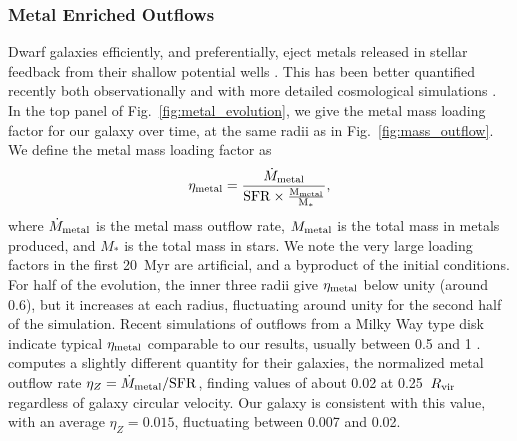 \documentclass[twocolumn]{aastex61}
\begin{document}
\subsubsection{Metal Enriched Outflows}
Dwarf galaxies efficiently, and preferentially, eject metals released in stellar feedback from their shallow potential wells \citep{MacLowFerrara1999,FerraraTolstoy2000}. This has been better quantified recently both observationally \citep[e.g.][]{Kirby2011-metals,Zahid2012,Peeples2014,McQuinn2015} and with more detailed cosmological simulations \citep{Angles-Alcazar2017,Muratov2017}. In the top panel of Fig.~\ref{fig:metal_evolution}, we give the metal mass loading factor for our galaxy over time, at the same radii as in Fig.~\ref{fig:mass_outflow}. We define the metal mass loading factor as
\begin{equation} \label{eq:eta-metal}
\eta_{\rm metal} = \frac{\dot{M}_{\rm metal}}{\rm{SFR} \times \frac{M_{\rm metal}}{M_{*}}},
\end{equation}
where $\dot{M}_{\rm metal}$ is the metal mass outflow rate, $M_{\rm metal}$ is the total mass in metals produced, and $M_{*}$ is the total mass in stars. We note the very large loading factors in the first 20~Myr are artificial, and a byproduct of the initial conditions. For half of the evolution, the inner three radii give $\eta_{\rm metal}$ below unity (around 0.6), but it increases at each radius, fluctuating around unity for the second half of the simulation. Recent simulations of outflows from a Milky Way type disk indicate typical $\eta_{\rm metal}$ comparable to our results, usually between 0.5 and 1 \citep{Li2017,Fielding2017}. \cite{Muratov2017} computes a slightly different quantity for their galaxies, the normalized metal outflow rate $\eta_{Z} = \dot{M}_{\rm metal}/{\rm SFR}$, finding values of about 0.02 at 0.25~$R_{\rm vir}$ regardless of galaxy circular velocity. Our galaxy is consistent with this value, with an average $\eta_Z = 0.015$, fluctuating between 0.007 and 0.02.
\end{document}
